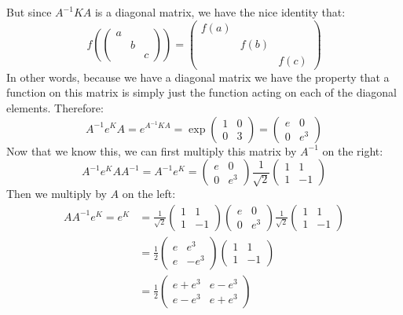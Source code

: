\documentclass{article}
\begin{document}
\begin{solution}
\[	\] 
	But since $A^{-1}KA$ is a diagonal matrix, we have the nice identity that:
	\[
		f\left( \begin{pmatrix} a & &\\ & b & \\ & & c \end{pmatrix} \right) = 
		\begin{pmatrix} f(a) & &\\ & f(b) & \\ & & f(c) \end{pmatrix} 
	\] 
	In other words, because we have a diagonal matrix we have the property that a function on this matrix 
	is simply just the function acting on each of the diagonal elements. Therefore:
	\[
		A^{-1}e^K A = e^{A^{-1}KA} = \exp{\begin{pmatrix} 1 & 0 \\ 0 & 3 \end{pmatrix}} 
		= \begin{pmatrix} e & 0 \\ 0 & e^3\end{pmatrix} 
	\] 
	Now that we know this, we can first multiply this matrix by $A^{-1}$ on the right:
	\[
		A^{-1} e^K A A^{-1} = A^{-1}e^K = \begin{pmatrix} e & 0 \\ 0 & e^3 \end{pmatrix} \frac{1}{\sqrt{2} }\begin{pmatrix} 1 & 1 \\ 1 & -1 \end{pmatrix} 
	\] 
	Then we multiply by $A$ on the left:
	\begin{align*}
		A A^{-1}e^K = e^K &= \frac{1}{\sqrt{2} }\begin{pmatrix} 1 & 1 \\ 1& -1 \end{pmatrix} \begin{pmatrix} e & 0\\ 0 & e^3 \end{pmatrix} \frac{1}{\sqrt{2} }\begin{pmatrix} 1 & 1\\ 1& -1 \end{pmatrix} \\
						  &=  \frac{1}{2}\begin{pmatrix} e & e^3\\ e & -e^3 \end{pmatrix}\begin{pmatrix} 1 & 1 \\ 1& -1 \end{pmatrix} \\
						  &= \frac{1}{2}\begin{pmatrix} e + e^3 & e - e^3\\ e - e^3 & e + e^3 \end{pmatrix} 
	\end{align*} 
\end{solution}

\endofhomework
\addfooter
\end{document}
